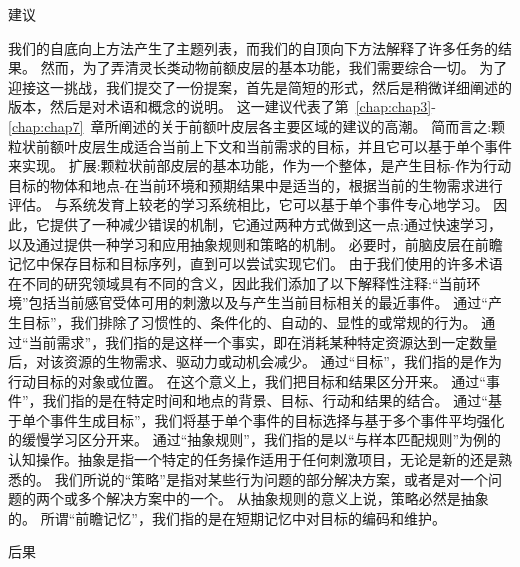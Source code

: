 建议

我们的自底向上方法产生了主题列表，而我们的自顶向下方法解释了许多任务的结果。
然而，为了弄清灵长类动物前额皮层的基本功能，我们需要综合一切。
为了迎接这一挑战，我们提交了一份提案，首先是简短的形式，然后是稍微详细阐述的版本，然后是对术语和概念的说明。
这一建议代表了第~\ref{chap:chap3}-\ref{chap:chap7}~章所阐述的关于前额叶皮层各主要区域的建议的高潮。
简而言之:颗粒状前额叶皮层生成适合当前上下文和当前需求的目标，并且它可以基于单个事件来实现。
扩展:颗粒状前部皮层的基本功能，作为一个整体，是产生目标-作为行动目标的物体和地点-在当前环境和预期结果中是适当的，根据当前的生物需求进行评估。
与系统发育上较老的学习系统相比，它可以基于单个事件专心地学习。
因此，它提供了一种减少错误的机制，它通过两种方式做到这一点:通过快速学习，以及通过提供一种学习和应用抽象规则和策略的机制。
必要时，前脑皮层在前瞻记忆中保存目标和目标序列，直到可以尝试实现它们。
由于我们使用的许多术语在不同的研究领域具有不同的含义，因此我们添加了以下解释性注释:“当前环境”包括当前感官受体可用的刺激以及与产生当前目标相关的最近事件。
通过“产生目标”，我们排除了习惯性的、条件化的、自动的、显性的或常规的行为。
通过“当前需求”，我们指的是这样一个事实，即在消耗某种特定资源达到一定数量后，对该资源的生物需求、驱动力或动机会减少。
通过“目标”，我们指的是作为行动目标的对象或位置。
在这个意义上，我们把目标和结果区分开来。
通过“事件”，我们指的是在特定时间和地点的背景、目标、行动和结果的结合。
通过“基于单个事件生成目标”，我们将基于单个事件的目标选择与基于多个事件平均强化的缓慢学习区分开来。
通过“抽象规则”，我们指的是以“与样本匹配规则”为例的认知操作。抽象是指一个特定的任务操作适用于任何刺激项目，无论是新的还是熟悉的。
我们所说的“策略”是指对某些行为问题的部分解决方案，或者是对一个问题的两个或多个解决方案中的一个。
从抽象规则的意义上说，策略必然是抽象的。
所谓“前瞻记忆”，我们指的是在短期记忆中对目标的编码和维护。



后果

